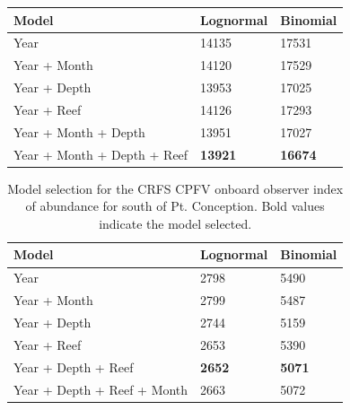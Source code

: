 \documentclass[12pt,]{article}
\begin{document}
\begin{table}[ht]
\begin{tabular}{lll}
  \hline
Model & Lognormal & Binomial \\ 
  \hline
Year & 14135 & 17531 \\ 
  Year + Month & 14120 & 17529 \\ 
  Year + Depth & 13953 & 17025 \\ 
  Year + Reef & 14126 & 17293 \\ 
  Year + Month + Depth & 13951 & 17027 \\ 
  Year + Month + Depth + Reef & \textbf{13921} & \textbf{16674} \\ 
   \hline
\end{tabular}
\end{table}\begin{table}[ht]
\centering
\caption{Model selection for the CRFS CPFV onboard observer 
                                        index of abundance for south of Pt. Conception. Bold 
                                        values indicate the model selected.} 
\label{tab:Fleet7_AIC}
\begin{tabular}{lll}
  \hline
Model & Lognormal & Binomial \\ 
  \hline
Year & 2798 & 5490 \\ 
  Year + Month & 2799 & 5487 \\ 
  Year + Depth & 2744 & 5159 \\ 
  Year + Reef & 2653 & 5390 \\ 
  Year + Depth + Reef & \textbf{2652} & \textbf{5071} \\ 
  Year + Depth + Reef + Month & 2663 & 5072 \\ 
   \hline
\end{tabular}
\end{table}

\FloatBarrier
\end{document}
